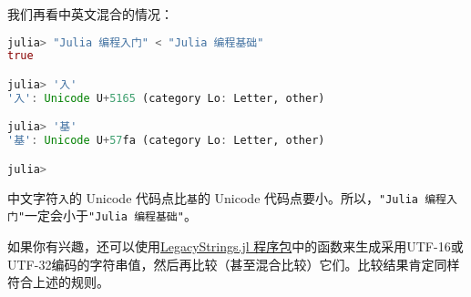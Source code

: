 我们再看中英文混合的情况：
\begin{lstlisting}[language=julia]
julia> "Julia 编程入门" < "Julia 编程基础"
true

julia> '入'
'入': Unicode U+5165 (category Lo: Letter, other)

julia> '基'
'基': Unicode U+57fa (category Lo: Letter, other)

julia> 
\end{lstlisting}

中文字符\verb`入`的 Unicode 代码点比\verb`基`的 Unicode 代码点要小。所以，\verb`"Julia 编程入门"`一定会小于\verb`"Julia 编程基础"`。

如果你有兴趣，还可以使用\href{https://github.com/JuliaStrings/LegacyStrings.jl}{LegacyStrings.jl 程序包}中的函数来生成采用UTF-16或UTF-32编码的字符串值，然后再比较（甚至混合比较）它们。比较结果肯定同样符合上述的规则。
